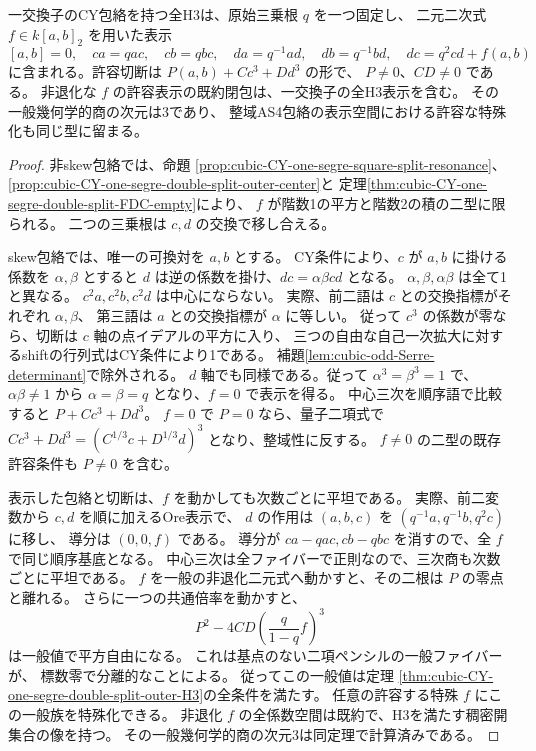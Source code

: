 \begin{theorem}[一交換子CYの共通閉包と閉性]
\label{thm:cubic-CY-one-commutator-presentation-closure}
一交換子のCY包絡を持つ全H3は、原始三乗根 $q$ を一つ固定し、
二元二次式 $f\in k[a,b]_2$ を用いた表示
\[
 [a,b]=0,\quad ca=qac,\quad cb=qbc,\quad
 da=q^{-1}ad,\quad db=q^{-1}bd,\quad dc=q^2cd+f(a,b)
\]
に含まれる。許容切断は $P(a,b)+Cc^3+Dd^3$ の形で、
$P\ne0$、$CD\ne0$ である。
非退化な $f$ の許容表示の既約閉包は、一交換子の全H3表示を含む。
その一般幾何学的商の次元は3であり、
整域AS4包絡の表示空間における許容な特殊化も同じ型に留まる。
\end{theorem}
\begin{proof}
非skew包絡では、命題
\ref{prop:cubic-CY-one-segre-square-split-resonance}、
\ref{prop:cubic-CY-one-segre-double-split-outer-center}と
定理\ref{thm:cubic-CY-one-segre-double-split-FDC-empty}により、
$f$ が階数1の平方と階数2の積の二型に限られる。
二つの三乗根は $c,d$ の交換で移し合える。

skew包絡では、唯一の可換対を $a,b$ とする。
CY条件により、$c$ が $a,b$ に掛ける係数を $\alpha,\beta$ とすると
$d$ は逆の係数を掛け、$dc=\alpha\beta cd$ となる。
$\alpha,\beta,\alpha\beta$ は全て1と異なる。
$c^2a,c^2b,c^2d$ は中心にならない。
実際、前二語は $c$ との交換指標がそれぞれ $\alpha,\beta$、
第三語は $a$ との交換指標が $\alpha$ に等しい。
従って $c^3$ の係数が零なら、切断は $c$ 軸の点イデアルの平方に入り、
三つの自由な自己一次拡大に対するshiftの行列式はCY条件により1である。
補題\ref{lem:cubic-odd-Serre-determinant}で除外される。
$d$ 軸でも同様である。従って $\alpha^3=\beta^3=1$ で、
$\alpha\beta\ne1$ から $\alpha=\beta=q$ となり、$f=0$ で表示を得る。
中心三次を順序語で比較すると $P+Cc^3+Dd^3$。
$f=0$ で $P=0$ なら、量子二項式で
$Cc^3+Dd^3=(C^{1/3}c+D^{1/3}d)^3$ となり、整域性に反する。
$f\ne0$ の二型の既存許容条件も $P\ne0$ を含む。

表示した包絡と切断は、$f$ を動かしても次数ごとに平坦である。
実際、前二変数から $c,d$ を順に加えるOre表示で、
$d$ の作用は $(a,b,c)$ を $(q^{-1}a,q^{-1}b,q^2c)$ に移し、
導分は $(0,0,f)$ である。
導分が $ca-qac,cb-qbc$ を消すので、全 $f$ で同じ順序基底となる。
中心三次は全ファイバーで正則なので、三次商も次数ごとに平坦である。
$f$ を一般の非退化二元式へ動かすと、その二根は $P$ の零点と離れる。
さらに一つの共通倍率を動かすと、
\[
 P^2-4CD\left(\frac{q}{1-q}f\right)^3
\]
は一般値で平方自由になる。
これは基点のない二項ペンシルの一般ファイバーが、
標数零で分離的なことによる。
従ってこの一般値は定理
\ref{thm:cubic-CY-one-segre-double-split-outer-H3}の全条件を満たす。
任意の許容する特殊 $f$ にこの一般族を特殊化できる。
非退化 $f$ の全係数空間は既約で、H3を満たす稠密開集合の像を持つ。
その一般幾何学的商の次元3は同定理で計算済みである。


\end{proof}
